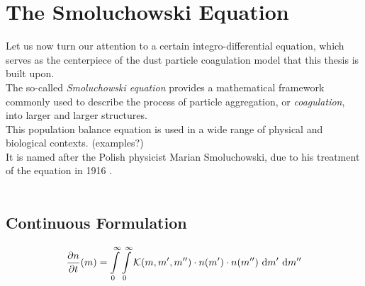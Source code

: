 \section{The Smoluchowski Equation}

    Let us now turn our attention to a certain integro-differential equation, which serves as the
    centerpiece of the dust particle coagulation model that this thesis is built upon. \\

    The so-called \textit{Smoluchowski equation} provides a mathematical framework commonly used 
    to describe the process of particle aggregation, or \textit{coagulation}, into larger and 
    larger structures. \\

    This population balance equation is used in a wide range of physical and biological contexts. 
    (examples?) \\

    It is named after the Polish physicist Marian Smoluchowski, due to his treatment of the 
    equation in 1916 \cite{smoluchowski_1916}. \\

     \\

    \subsection{Continuous Formulation}

    
        \begin{equation}
            \label{eq:continuous_smoluchowski_equation}
            \frac{\partial n}{\partial t}(m)
                =
                    \int\limits_0^\infty
                    \int\limits_0^\infty
                    \mathcal K(m,m',m'')
                    \cdot n(m')
                    \cdot n(m'')
                    \ \text{d} m'
                    \ \text{d} m''
        \end{equation}

         \\

